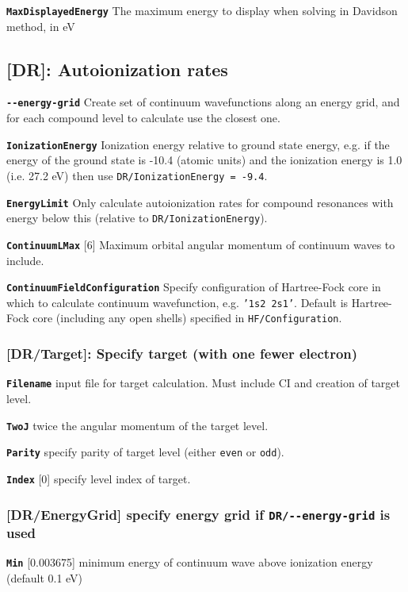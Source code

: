 \documentclass[a4paper,11pt]{article}
\newcommand{\option}[1]{\smallskip\noindent\textbf{\texttt{#1}}}
\newcommand{\code}[1]{\texttt{#1}}
\begin{document}
\option{MaxDisplayedEnergy} The maximum energy to display when solving in Davidson method, in eV

\subsection{[DR]: Autoionization rates}

\option{-{}-energy-grid} Create set of continuum wavefunctions along an energy grid, and for each compound level to calculate use the closest one.

\option{IonizationEnergy} Ionization energy relative to ground state energy, e.g. if the energy of the ground state is -10.4 (atomic units) and the ionization energy is  1.0 (i.e. 27.2 eV) then use \code{DR/IonizationEnergy = -9.4}.

\option{EnergyLimit} Only calculate autoionization rates for compound resonances with energy below this (relative to \code{DR/IonizationEnergy}).

\option{ContinuumLMax} [6] Maximum orbital angular momentum of continuum waves to include.

\option{ContinuumFieldConfiguration} Specify configuration of Hartree-Fock core in which to calculate continuum wavefunction, e.g. \code{'1s2 2s1'}. Default is Hartree-Fock core (including any open shells) specified in \code{HF/Configuration}.

\subsubsection{[DR/Target]: Specify target (with one fewer electron)}

\option{Filename} input file for target calculation. Must include CI and creation of target level.

\option{TwoJ} twice the angular momentum of the target level.

\option{Parity} specify parity of target level (either \code{even} or \code{odd}).

\option{Index} [0] specify level index of target.

\subsubsection{[DR/EnergyGrid] specify energy grid if \code{DR/-{}-energy-grid} is used}

\option{Min} [0.003675] minimum energy of continuum wave above ionization energy (default 0.1 eV)
\end{document}
